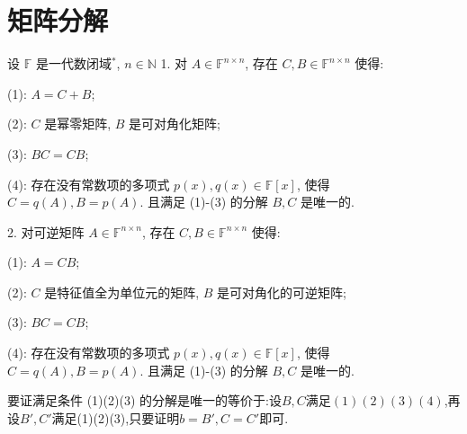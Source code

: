 \documentclass[../../main.tex]{subfiles}
\begin{document}
\section{矩阵分解}

\begin{theorem}[Jordan分解]\label{theorem:矩阵分解-Jordan分解}
设 \( \mathbb{F} \) 是一代数闭域\( ^* \), \( n \in \mathbb{N} \)
1. 对 \( A \in \mathbb{F}^{n \times n} \), 存在 \( C, B \in \mathbb{F}^{n \times n} \) 使得:

(1): \( A = C + B \);

(2): \( C \) 是幂零矩阵, \( B \) 是可对角化矩阵;

(3): \( BC = CB \);

(4): 存在没有常数项的多项式 \( p(x), q(x) \in \mathbb{F}[x] \), 使得 \( C = q(A), B = p(A) \). 且满足 (1)-(3) 的分解 \( B, C \) 是唯一的.

2. 对可逆矩阵 \( A \in \mathbb{F}^{n \times n} \), 存在 \( C, B \in \mathbb{F}^{n \times n} \) 使得:

(1): \( A = CB \);

(2): \( C \) 是特征值全为单位元的矩阵, \( B \) 是可对角化的可逆矩阵;

(3): \( BC = CB \);

(4): 存在没有常数项的多项式 \( p(x), q(x) \in \mathbb{F}[x] \), 使得 \( C = q(A), B = p(A) \). 且满足 (1)-(3) 的分解 \( B, C \) 是唯一的.
\end{theorem}
\begin{remark}
要证满足条件 (1)(2)(3) 的分解是唯一的等价于:设$B,C$满足$(1)(2)(3)(4)$,再设$B',C'$满足(1)(2)(3),只要证明$b=B',C=C'$即可.
\end{remark}
\end{document}
